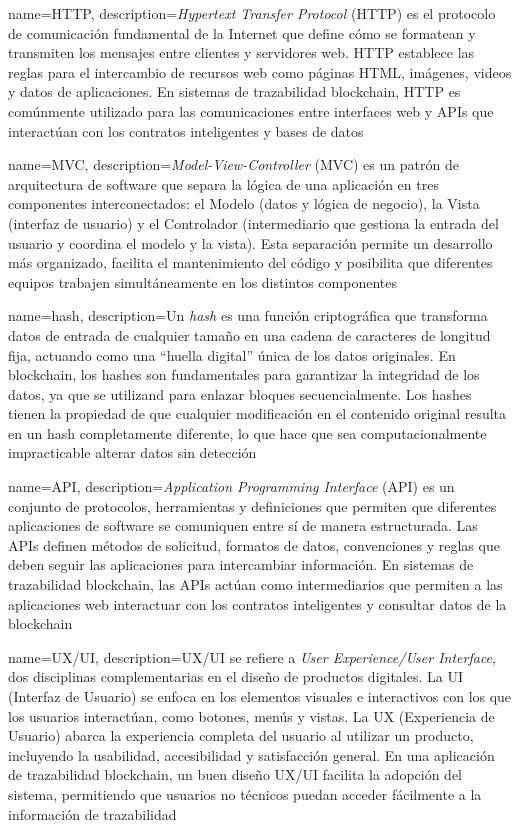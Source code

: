 {
    name=HTTP,
    description={\textit{Hypertext Transfer Protocol} (HTTP) es el protocolo de comunicación fundamental de la Internet que define cómo se formatean y transmiten los mensajes entre clientes y servidores web. HTTP establece las reglas para el intercambio de recursos web como páginas HTML, imágenes, videos y datos de aplicaciones. En sistemas de trazabilidad blockchain, HTTP es comúnmente utilizado para las comunicaciones entre interfaces web y APIs que interactúan con los contratos inteligentes y bases de datos}
}

{
    name=MVC,
    description={\textit{Model-View-Controller} (MVC) es un patrón de arquitectura de software que separa la lógica de una aplicación en tres componentes interconectados: el Modelo (datos y lógica de negocio), la Vista (interfaz de usuario) y el Controlador (intermediario que gestiona la entrada del usuario y coordina el modelo y la vista). Esta separación permite un desarrollo más organizado, facilita el mantenimiento del código y posibilita que diferentes equipos trabajen simultáneamente en los distintos componentes}
}

{
    name=hash,
    description={Un \textit{hash} es una función criptográfica que transforma datos de entrada de cualquier tamaño en una cadena de caracteres de longitud fija, actuando como una ``huella digital'' única de los datos originales. En blockchain, los hashes son fundamentales para garantizar la integridad de los datos, ya que se utilizand para enlazar bloques secuencialmente. Los hashes tienen la propiedad de que cualquier modificación en el contenido original resulta en un hash completamente diferente, lo que hace que sea computacionalmente impracticable alterar datos sin detección}
}

{
    name=API,
    description={\textit{Application Programming Interface} (API) es un conjunto de protocolos, herramientas y definiciones que permiten que diferentes aplicaciones de software se comuniquen entre sí de manera estructurada. Las APIs definen métodos de solicitud, formatos de datos, convenciones y reglas que deben seguir las aplicaciones para intercambiar información. En sistemas de trazabilidad blockchain, las APIs actúan como intermediarios que permiten a las aplicaciones web interactuar con los contratos inteligentes y consultar datos de la blockchain}
}   

{
    name=UX/UI,
    description={UX/UI se refiere a \textit{User Experience/User Interface}, dos disciplinas complementarias en el diseño de productos digitales. La UI (Interfaz de Usuario) se enfoca en los elementos visuales e interactivos con los que los usuarios interactúan, como botones, menús y vistas. La UX (Experiencia de Usuario) abarca la experiencia completa del usuario al utilizar un producto, incluyendo la usabilidad, accesibilidad y satisfacción general. En una aplicación de trazabilidad blockchain, un buen diseño UX/UI facilita la adopción del sistema, permitiendo que usuarios no técnicos puedan acceder fácilmente a la información de trazabilidad}
}

